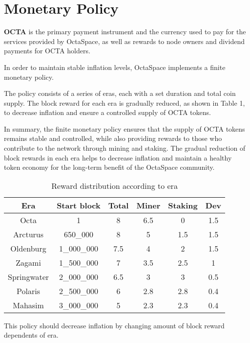 \section{Monetary Policy}
\label{sec:mp}

\textbf{OCTA} is the primary payment instrument and the currency used to pay for the services provided by OctaSpace, as well as rewards to node owners and dividend payments for OCTA holders.

In order to maintain stable inflation levels, OctaSpace implements a finite monetary policy.

The policy consists of a series of eras, each with a set duration and total coin supply. The block reward for each era is gradually reduced, as shown in Table 1, to decrease inflation and ensure a controlled supply of OCTA tokens.


In summary, the finite monetary policy ensures that the supply of OCTA tokens remains stable and controlled, while also providing rewards to those who contribute to the network through mining and staking. The gradual reduction of block rewards in each era helps to decrease inflation and maintain a healthy token economy for the long-term benefit of the OctaSpace community.

\begin{table}[h!]
\centering
\begin{tabular}{||c c c c c c||}
    \hline
        Era & Start block & Total & Miner & Staking & Dev \\ [0.5ex]

        \hline\hline
        Octa & 1 & 8 & 6.5 & 0 & 1.5 \\
        Arcturus & 650\_000 & 8 & 5 & 1.5 & 1.5 \\
        Oldenburg & 1\_000\_000 & 7.5 & 4 & 2 & 1.5 \\
        Zagami & 1\_500\_000 & 7 & 3.5 & 2.5 & 1 \\
        Springwater & 2\_000\_000 & 6.5 & 3 & 3 & 0.5 \\
        Polaris & 2\_500\_000 & 6 & 2.8 & 2.8 & 0.4 \\
        Mahasim & 3\_000\_000 & 5 & 2.3 & 2.3 & 0.4 \\ [1ex]
    \hline

\end{tabular}
\caption{Reward distribution according to era}
\label{table:1}
\end{table}

This policy should decrease inflation by changing amount of block reward dependents of era.

